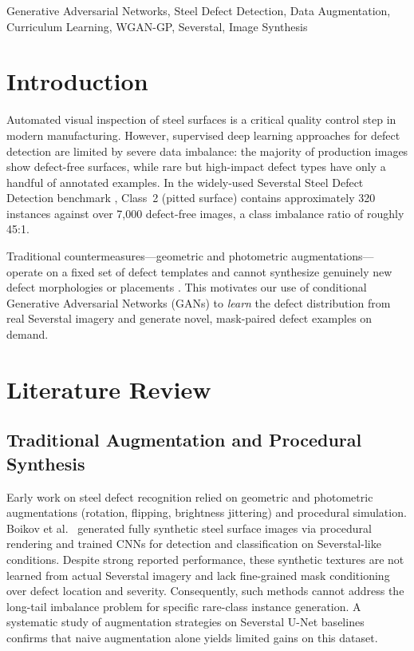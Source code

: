 \documentclass[conference]{IEEEtran}
\begin{document}
\begin{IEEEkeywords}
Generative Adversarial Networks, Steel Defect Detection, Data Augmentation,
Curriculum Learning, WGAN-GP, Severstal, Image Synthesis
\end{IEEEkeywords}

\section{Introduction}

Automated visual inspection of steel surfaces is a critical quality
control step in modern manufacturing. However, supervised deep learning
approaches for defect detection are limited by severe data imbalance:
the majority of production images show defect-free surfaces, while
rare but high-impact defect types have only a handful of annotated
examples. In the widely-used Severstal Steel Defect Detection
benchmark \cite{severstal_kaggle}, Class~2 (pitted surface) contains
approximately 320 instances against over 7,000 defect-free images,
a class imbalance ratio of roughly 45:1.

Traditional countermeasures---geometric and photometric
augmentations---operate on a fixed set of defect templates and cannot
synthesize genuinely new defect morphologies or placements
\cite{severstal_aug_study}. This motivates our use of conditional
Generative Adversarial Networks (GANs) to \emph{learn} the defect
distribution from real Severstal imagery and generate novel,
mask-paired defect examples on demand.

\section{Literature Review}

\subsection{Traditional Augmentation and Procedural Synthesis}

Early work on steel defect recognition relied on geometric and
photometric augmentations (rotation, flipping, brightness jittering)
and procedural simulation. Boikov et al.\ \cite{boikov2021synthetic}
generated fully synthetic steel surface images via procedural rendering
and trained CNNs for detection and classification on Severstal-like
conditions. Despite strong reported performance, these synthetic textures
are not learned from actual Severstal imagery and lack fine-grained mask
conditioning over defect location and severity. Consequently, such methods
cannot address the long-tail imbalance problem for specific rare-class
instance generation. A systematic study of augmentation strategies on
Severstal U-Net baselines \cite{severstal_aug_study} confirms that
naive augmentation alone yields limited gains on this dataset.
\end{document}
